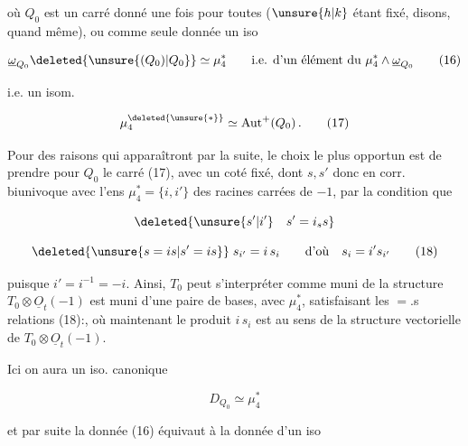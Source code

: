 
où $Q_0$ est un carré donné une fois pour toutes ($\unsure{h|k}$ étant fixé, disons, quand même), ou comme seule donnée un iso

\[
\underline{\omega}_{Q_0}\deleted{\unsure{(Q_0)|Q_0}}\simeq\mu_4^*
\qquad\text{i.e. d'un élément du }\mu_4^*\wedge\underline{\omega}_{Q_0}
\tag*{(16)}
\]

i.e. un isom.

\[
\mu_4^{\deleted{\unsure{*}}}\simeq\mathrm{Aut}^+(Q_0)\,.
\tag*{(17)}
\]

Pour des raisons qui apparaîtront par la suite, le choix le plus opportun est de prendre pour $Q_0$ le carré   (17), avec un coté fixé, dont   $s,s'$  donc en corr. biunivoque avec l'ens $\mu_4^*=\{i,i'\}$ des racines carrées de $-1$, par la condition que


\[
\deleted{\unsure{s'|i'}\quad s'=i_s s}
\]

\[
\deleted{\unsure{s=is|s'=is}}\;s_{i'}=i\,s_i\qquad\text{d'où}\quad s_i=i's_{i'}
\tag*{(18)}
\]

puisque $i'=i^{-1}=-i$. Ainsi, $T_0$ peut s'interpréter comme muni de la structure   $T_0\otimes\underline{O}_{t}(-1)$ est muni d'une paire de bases,   avec $\mu_4^*$, satisfaisant les $=$.s relations (18):, où maintenant le produit $i\,s_i$ est au sens de la structure vectorielle de $T_0\otimes\underline O_t(-1)$. 

Ici on aura un iso. canonique

\[
D_{Q_0}\simeq\mu_4^*
\tag*{(19)}
\]

et par suite la donnée (16) équivaut à la donnée d'un iso
